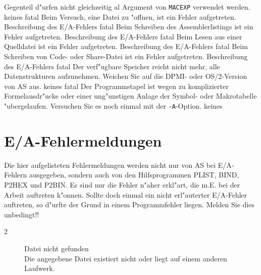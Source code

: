 \documentclass[12pt,a4paper,twoside]{report}
\newcommand{\tty}[1]{{\tt #1}}
\begin{document}
{\begin{description}
{                Gegenteil d"urfen nicht gleichzeitig al Argument
                von \tty{MACEXP} verwendet werden.}
               {keines}
               {fatal}
               {Beim Versuch, eine Datei zu "offnen, ist ein
                Fehler aufgetreten.}
               {Beschreibung des E/A-Fehlers}
               {fatal}
               {Beim Schreiben des Assemblerlistings ist ein
                Fehler aufgetreten.}
               {Beschreibung des E/A-Fehlers}
               {fatal}
               {Beim Lesen aus einer Quelldatei ist ein
                Fehler aufgetreten.}
               {Beschreibung des E/A-Fehlers}
               {fatal}
               {Beim Schreiben von Code- oder Share-Datei
                ist ein Fehler aufgetreten.}
               {Beschreibung des E/A-Fehlers}
               {fatal}
               {Der verf"ugbare Speicher reicht nicht mehr,
	        alle Datenstrukturen aufzunehmen.  Weichen Sie auf die
	        DPMI- oder OS/2-Version von AS aus.}
               {keines}
               {fatal}
               {Der Programmstapel ist wegen zu komplizierter
	        Formelausdr"ucke oder einer ung"unstigen Anlage der Symbol-
	        oder Makrotabelle "ubergelaufen.  Versuchen Sie es noch
	        einmal mit der \tty{-A}-Option.}
               {keines}
\end{description}


\cleardoublepage
\chapter{E/A-Fehlermeldungen}

Die hier aufgelisteten Fehlermeldungen werden nicht nur von AS bei E/A-
Fehlern ausgegeben, sondern auch von den Hilfsprogrammen PLIST, BIND,
P2HEX und P2BIN.  Es sind nur die Fehler n"aher erkl"art, die m.E. bei
der Arbeit auftreten k"onnen.  Sollte doch einmal ein nicht erl"auterter
E/A-Fehler auftreten, so d"urfte der Grund in einem Programmfehler
liegen.  Melden Sie dies unbedingt!!

\begin{description}
\item[2]{Datei nicht gefunden\\
         Die angegebene Datei existiert nicht oder liegt auf einem
         anderen Laufwerk.}


\end{description}}
\end{document}

